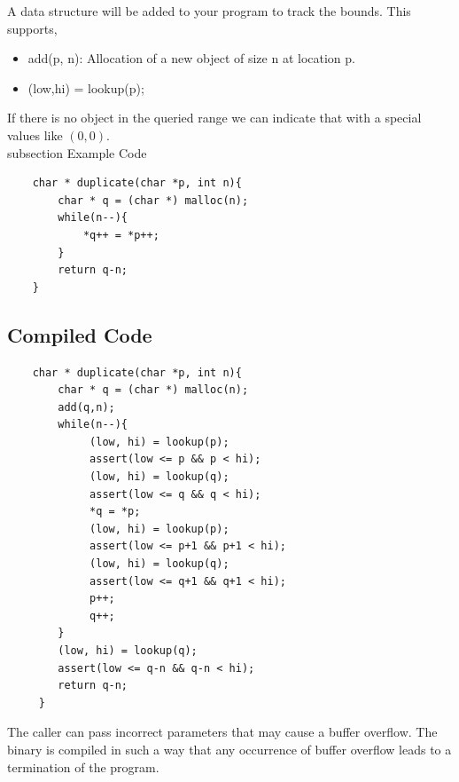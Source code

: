 \documentclass[11pt]{article} %
\begin{document}
A data structure will be added to your program to track the bounds. This supports,
\begin{itemize} \itemsep -2pt
\item add(p, n): Allocation of a new object of size n at location p.
\item (low,hi) = lookup(p);
\end{itemize}
If there is no object in the queried range we can indicate that with a special 
values like $(0,0)$.
\\
subsection {Example Code}
\begin{verbatim}
    char * duplicate(char *p, int n){
        char * q = (char *) malloc(n);
        while(n--){
            *q++ = *p++;
        }
        return q-n;
    }
\end{verbatim}
\subsection {Compiled Code}
\begin{verbatim}
    char * duplicate(char *p, int n){
        char * q = (char *) malloc(n);
        add(q,n); 
        while(n--){
             (low, hi) = lookup(p);
             assert(low <= p && p < hi);
             (low, hi) = lookup(q);
             assert(low <= q && q < hi);
             *q = *p;
             (low, hi) = lookup(p);
             assert(low <= p+1 && p+1 < hi);
             (low, hi) = lookup(q);
             assert(low <= q+1 && q+1 < hi);
             p++;
             q++;
        }
        (low, hi) = lookup(q);
        assert(low <= q-n && q-n < hi);
        return q-n;
     }
\end{verbatim}

The caller can pass incorrect parameters that may cause a buffer overflow. The
binary is compiled in such a way that any occurrence of buffer overflow leads to a
termination of the program.
\end{document}
